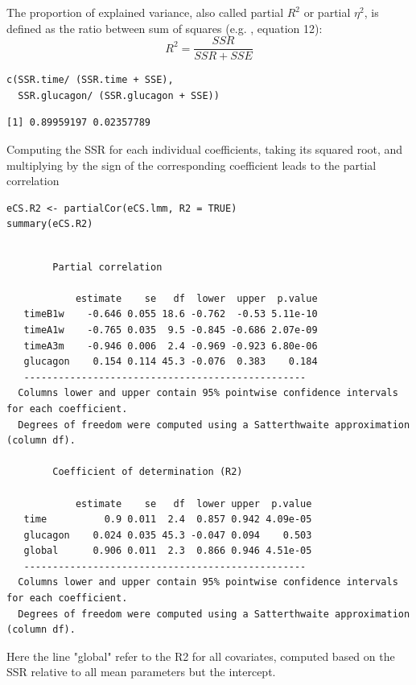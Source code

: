 \documentclass[12pt]{article}
\begin{document}
\bigskip

The proportion of explained variance, also called partial \(R^2\) or
partial \(\eta^2\), is defined as the ratio between sum of squares
(e.g. \cite{lakens2013calculating}, equation 12):
\[ R^2=\frac{SSR}{SSR + SSE} \]

\lstset{language=r,label= ,caption= ,captionpos=b,numbers=none}
\begin{lstlisting}
c(SSR.time/ (SSR.time + SSE),
  SSR.glucagon/ (SSR.glucagon + SSE))
\end{lstlisting}

\begin{verbatim}
[1] 0.89959197 0.02357789
\end{verbatim}


Computing the SSR for each individual coefficients, taking its squared
root, and multiplying by the sign of the corresponding coefficient
leads to the partial correlation
\lstset{language=r,label= ,caption= ,captionpos=b,numbers=none}
\begin{lstlisting}
eCS.R2 <- partialCor(eCS.lmm, R2 = TRUE)
summary(eCS.R2)
\end{lstlisting}

\begin{verbatim}

		Partial correlation 

            estimate    se   df  lower  upper  p.value
   timeB1w    -0.646 0.055 18.6 -0.762  -0.53 5.11e-10
   timeA1w    -0.765 0.035  9.5 -0.845 -0.686 2.07e-09
   timeA3m    -0.946 0.006  2.4 -0.969 -0.923 6.80e-06
   glucagon    0.154 0.114 45.3 -0.076  0.383    0.184
   ------------------------------------------------- 
  Columns lower and upper contain 95% pointwise confidence intervals for each coefficient.
  Degrees of freedom were computed using a Satterthwaite approximation (column df). 

		Coefficient of determination (R2)

            estimate    se   df  lower upper  p.value
   time          0.9 0.011  2.4  0.857 0.942 4.09e-05
   glucagon    0.024 0.035 45.3 -0.047 0.094    0.503
   global      0.906 0.011  2.3  0.866 0.946 4.51e-05
   ------------------------------------------------- 
  Columns lower and upper contain 95% pointwise confidence intervals for each coefficient.
  Degrees of freedom were computed using a Satterthwaite approximation (column df).
\end{verbatim}

Here the line "global" refer to the R2 for all covariates, computed
based on the SSR relative to all mean parameters but the intercept.
\end{document}
